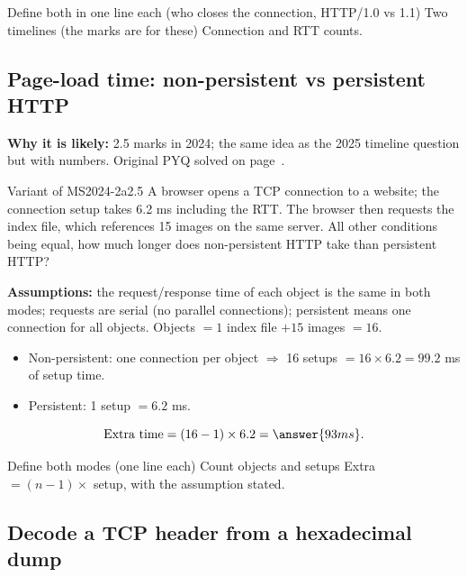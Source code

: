 \begin{answerplan}[2 marks]
 Define both in one line each (who closes the connection, HTTP/1.0 vs 1.1) \quad {} Two timelines (the marks are for these) \quad {} Connection and RTT counts.
\end{answerplan}

\subsection{Page-load time: non-persistent vs persistent HTTP}\label{iq:C12}
    

\textbf{Why it is likely:} 2.5 marks in 2024; the same idea as the 2025 timeline question but with numbers. Original PYQ solved on page~\pageref{q:MS2024-2a}.

\begin{question}{Variant of MS2024-2a}{2.5}
A browser opens a TCP connection to a website; the connection setup takes 6.2 ms including the RTT. The browser then requests the index file, which references 15 images on the same server. All other conditions being equal, how much longer does non-persistent HTTP take than persistent HTTP?
\end{question}
\begin{solution}
\textbf{Assumptions:} the request/response time of each object is the same in both modes; requests are serial (no parallel connections); persistent means one connection for all objects.
Objects $=1$ index file $+15$ images $=16$.
\begin{itemize}
\item Non-persistent: one connection per object $\Rightarrow$ 16 setups $=16\times6.2=99.2$ ms of setup time.
\item Persistent: 1 setup $=6.2$ ms.
\end{itemize}
\[ \text{Extra time} = (16-1)\times 6.2 = \answer{93 ms}. \]
\end{solution}
\begin{answerplan}[2.5 marks]
 Define both modes (one line each) \quad {} Count objects and setups \quad {} Extra $=(n-1)\times$ setup, with the assumption stated.
\end{answerplan}

\subsection{Decode a TCP header from a hexadecimal dump}\label{iq:C31}
    

